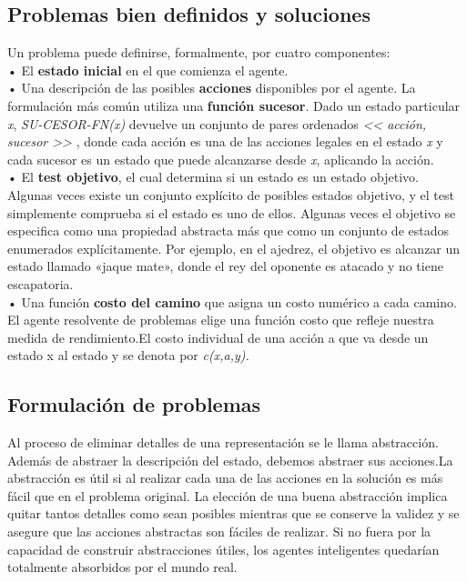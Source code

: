 \documentclass[12pt,a4paper]{report}
\begin{document}
\subsection*{Problemas bien definidos y soluciones}
Un problema puede definirse, formalmente, por cuatro componentes:\\• El \textbf{estado inicial} en el que comienza el agente.\\• Una descripción de las posibles \textbf{acciones} disponibles por el agente. La formulación más común utiliza una \textbf{función sucesor}. Dado un estado particular \emph{x}, \emph{SU-CESOR-FN(x)} devuelve un conjunto de pares ordenados \emph{<< acción, sucesor >>} , donde cada acción es una de las acciones legales en el estado \emph{x} y cada sucesor es un estado que puede alcanzarse desde \emph{x}, aplicando la acción.\\• El \textbf{test objetivo}, el cual determina si un estado es un estado objetivo. Algunas veces existe un conjunto explícito de posibles estados objetivo, y el test simplemente comprueba si el estado es uno de ellos. Algunas veces el objetivo se especifica como una propiedad abstracta más que como un conjunto de estados enumerados explícitamente. Por ejemplo, en el ajedrez, el objetivo es alcanzar un estado llamado «jaque mate», donde el rey del oponente es atacado y no tiene escapatoria.\\• Una función \textbf{ costo del camino} que asigna un costo numérico a cada camino. El agente resolvente de problemas elige una función costo que refleje nuestra medida de rendimiento.El costo individual de una acción a que va desde un estado x al estado y se denota por \emph{ c(x,a,y).}
\subsection*{Formulación de problemas}
Al proceso de eliminar detalles de
una representación se le llama abstracción. Además de abstraer la descripción del estado, debemos abstraer sus acciones.La abstracción es útil si al realizar cada una de las acciones en la solución es más fácil que en el problema original. La elección de una buena abstracción implica quitar tantos detalles como sean posibles mientras que se conserve la validez y se asegure que las acciones abstractas son fáciles de realizar. Si no fuera por la capacidad de construir abstracciones útiles, los agentes inteligentes quedarían totalmente absorbidos por el mundo real.
\end{document}
